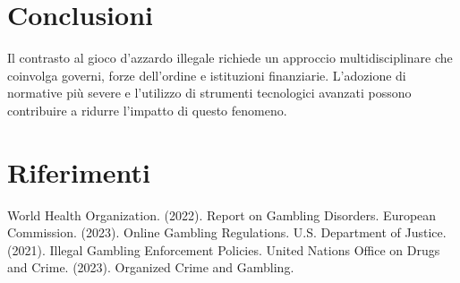 \documentclass[a4paper,12pt]{article}
\begin{document}
\section{Conclusioni}
Il contrasto al gioco d'azzardo illegale richiede un approccio multidisciplinare che coinvolga governi, forze dell'ordine e istituzioni finanziarie. L'adozione di normative più severe e l'utilizzo di strumenti tecnologici avanzati possono contribuire a ridurre l'impatto di questo fenomeno.

\section{Riferimenti}
\begin{thebibliography}{9}
     World Health Organization. (2022). Report on Gambling Disorders.
     European Commission. (2023). Online Gambling Regulations.
     U.S. Department of Justice. (2021). Illegal Gambling Enforcement Policies.
     United Nations Office on Drugs and Crime. (2023). Organized Crime and Gambling.
\end{thebibliography}
\end{document}

